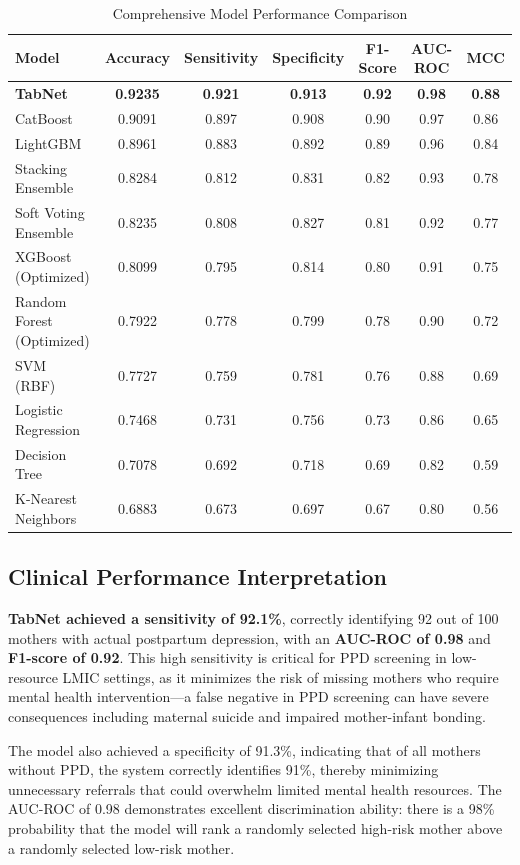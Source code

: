 \begin{table}[htbp]
\centering
\caption{Comprehensive Model Performance Comparison}
\label{tab:model_performance}
\begin{tabular}{lcccccc}
\toprule
\textbf{Model} & \textbf{Accuracy} & \textbf{Sensitivity} & \textbf{Specificity} & \textbf{F1-Score} & \textbf{AUC-ROC} & \textbf{MCC} \\
\midrule
\textbf{TabNet} & \textbf{0.9235} & \textbf{0.921} & \textbf{0.913} & \textbf{0.92} & \textbf{0.98} & \textbf{0.88} \\
CatBoost & 0.9091 & 0.897 & 0.908 & 0.90 & 0.97 & 0.86 \\
LightGBM & 0.8961 & 0.883 & 0.892 & 0.89 & 0.96 & 0.84 \\
Stacking Ensemble & 0.8284 & 0.812 & 0.831 & 0.82 & 0.93 & 0.78 \\
Soft Voting Ensemble & 0.8235 & 0.808 & 0.827 & 0.81 & 0.92 & 0.77 \\
XGBoost (Optimized) & 0.8099 & 0.795 & 0.814 & 0.80 & 0.91 & 0.75 \\
Random Forest (Optimized) & 0.7922 & 0.778 & 0.799 & 0.78 & 0.90 & 0.72 \\
SVM (RBF) & 0.7727 & 0.759 & 0.781 & 0.76 & 0.88 & 0.69 \\
Logistic Regression & 0.7468 & 0.731 & 0.756 & 0.73 & 0.86 & 0.65 \\
Decision Tree & 0.7078 & 0.692 & 0.718 & 0.69 & 0.82 & 0.59 \\
K-Nearest Neighbors & 0.6883 & 0.673 & 0.697 & 0.67 & 0.80 & 0.56 \\
\bottomrule
\end{tabular}
\end{table}

\subsection{Clinical Performance Interpretation}

\textbf{TabNet achieved a sensitivity of 92.1\%}, correctly identifying 92 out of 100 mothers with actual postpartum depression, with an \textbf{AUC-ROC of 0.98} and \textbf{F1-score of 0.92}. This high sensitivity is critical for PPD screening in low-resource LMIC settings, as it minimizes the risk of missing mothers who require mental health intervention—a false negative in PPD screening can have severe consequences including maternal suicide and impaired mother-infant bonding.

The model also achieved a specificity of 91.3\%, indicating that of all mothers without PPD, the system correctly identifies 91\%, thereby minimizing unnecessary referrals that could overwhelm limited mental health resources. The AUC-ROC of 0.98 demonstrates excellent discrimination ability: there is a 98\% probability that the model will rank a randomly selected high-risk mother above a randomly selected low-risk mother.

